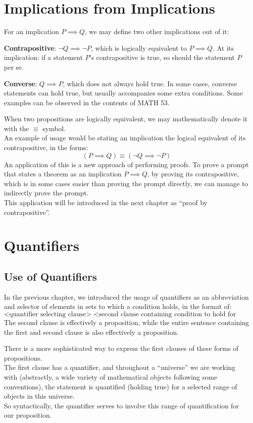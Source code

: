 \section{Implications from Implications}
For an implication $P \implies Q$, we may define two other implications out of it:
\begin{bindenum}
    \item \textbf{Contrapositive}: $\neg Q \implies \neg P$, which is logically equivalent to $P \implies Q$. At its implication: if a statement $P$'s contrapositive is true, so should the statement $P$ per se.
    \item \textbf{Converse}: $Q \implies P$, which does not always hold true. In some cases, converse statements can hold true, but usually accompanies some extra conditions. Some examples can be observed in the contents of MATH 53.
\end{bindenum}

When two propositions are logically equivalent, we may mathematically denote it with the $\equiv$ symbol. \\
An example of usage would be stating an implication the logical equivalent of its contrapositive, in the forms:
\[(P \implies Q) \equiv (\neg Q \implies \neg P)\]
An application of this is a new approach of performing proofs. To prove a prompt that states a theorem as an implication $P \implies Q$, by proving its contrapositive, which is in some cases easier than proving the prompt directly, we can manage to indirectly prove the prompt. \\
This application will be introduced in the next chapter as ``proof by contrapositive''.

\section{Quantifiers}

\subsection{Use of Quantifiers}
In the previous chapter, we introduced the usage of quantifiers as an abbreviation and selector of elements in sets to which a condition holds, in the format of:
\[\text{<quantifier selecting clause> <second clause containing condition to hold for selected values>}\]
The second clause is effectively a proposition, while the entire sentence containing the first and second clause is also effectively a proposition.

There is a more sophisticated way to express the first clauses of these forms of propositions. \\
The first clause has a quantifier, and throughout a ``universe'' we are working with (abstractly, a wide variety of mathematical objects following some conventions), the statement is quantified (holding true) for a selected range of objects in this universe. \\
So syntactically, the quantifier serves to involve this range of quantification for our proposition.


